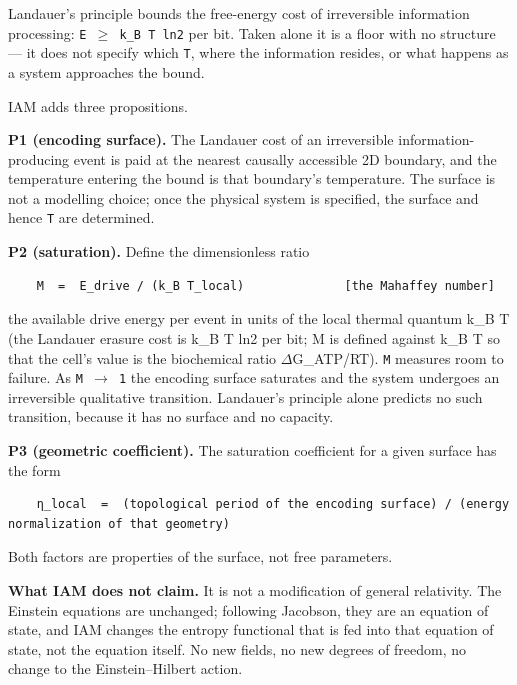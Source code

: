 \documentclass[12pt,a4paper]{article}
\begin{document}
Landauer's principle bounds the free-energy cost of irreversible information processing: \texttt{E $\geq$ k\_B T ln2} per bit. Taken alone it is a floor with no structure --- it does not specify which \texttt{T}, where the information resides, or what happens as a system approaches the bound.


IAM adds three propositions.


\textbf{P1 (encoding surface).} The Landauer cost of an irreversible information-producing event is paid at the nearest causally accessible 2D boundary, and the temperature entering the bound is that boundary's temperature. The surface is not a modelling choice; once the physical system is specified, the surface and hence \texttt{T} are determined.


\textbf{P2 (saturation).} Define the dimensionless ratio


\begin{lstlisting}
    M  =  E_drive / (k_B T_local)              [the Mahaffey number]
\end{lstlisting}


the available drive energy per event in units of the local thermal quantum k_B T (the Landauer erasure cost is k_B T ln2 per bit; M is defined against k_B T so that the cell's value is the biochemical ratio $\Delta$G\_ATP/RT). \texttt{M} measures room to failure. As \texttt{M $\rightarrow$ 1} the encoding surface saturates and the system undergoes an irreversible qualitative transition. Landauer's principle alone predicts no such transition, because it has no surface and no capacity.


\textbf{P3 (geometric coefficient).} The saturation coefficient for a given surface has the form


\begin{lstlisting}
    η_local  =  (topological period of the encoding surface) / (energy normalization of that geometry)
\end{lstlisting}


Both factors are properties of the surface, not free parameters.


\textbf{What IAM does not claim.} It is not a modification of general relativity. The Einstein equations are unchanged; following Jacobson, they are an equation of state, and IAM changes the entropy functional that is fed into that equation of state, not the equation itself. No new fields, no new degrees of freedom, no change to the Einstein--Hilbert action.
\end{document}
